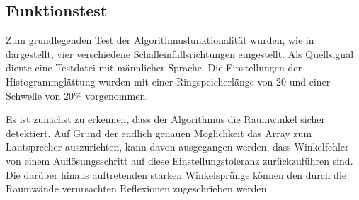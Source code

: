 \subsection{Funktionstest}
\label{subsec:Funktionstest}
Zum grundlegenden Test der Algorithmusfunktionalität wurden, wie in  dargestellt, vier verschiedene Schalleinfallsrichtungen eingestellt. Als Quellsignal diente eine Testdatei mit männlicher Sprache. Die Einstellungen der Histogrammglättung wurden mit einer Ringspeicherlänge von 20 und einer Schwelle von 20\% vorgenommen.

Es ist zunächst zu erkennen, dass der Algorithmus die Raumwinkel sicher detektiert. Auf Grund der endlich genauen Möglichkeit das Array zum Lautsprecher auszurichten, kann davon ausgegangen werden, dass Winkelfehler von einem Auflösungsschritt auf diese Einstellungstoleranz zurückzuführen sind. Die darüber hinaus auftretenden starken Winkelsprünge können den durch die Raumwände verursachten Reflexionen zugeschrieben werden. 
          


